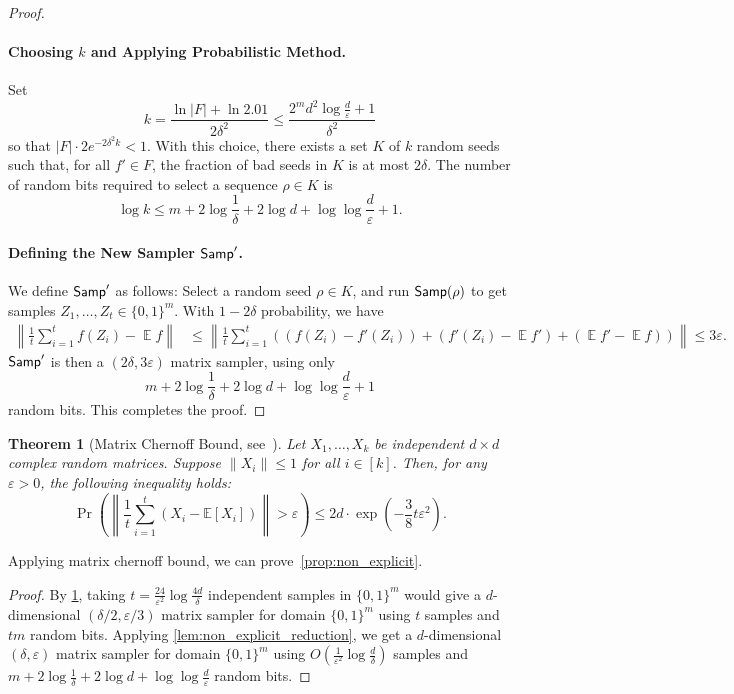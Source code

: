 \documentclass[11pt,letterpaper]{article}
\newtheorem{theorem}{Theorem}
\DeclareMathOperator*{\E}{\mathbb{E}}
\newcommand{\eps}{\varepsilon}
\newcommand{\1}{\mathbbm{1}}
\newcommand{\tuple}[1]{\left(#1\right)}
\newcommand{\zo}{\{0, 1\}}
\newcommand{\Smp}{\textup{\textsf{Samp}}}
\begin{document}
\begin{proof}
\paragraph{Choosing \( k \) and Applying Probabilistic Method.}
Set 
\[
k = \frac{\ln|F| + \ln 2.01}{2\delta^2} \le \frac{2^{m}d^2\log\frac{d}{\eps} + 1}{\delta^2}
\]
so that \( |F| \cdot 2 e^{-2\delta^2 k} < 1 \). With this choice, there exists a set \( K \) of \( k \) random seeds such that, for all \( f' \in F \), the fraction of bad seeds in \( K \) is at most \( 2\delta \). The number of random bits required to select a sequence \( \rho \in K \) is 
\[
\log k \le m + 2 \log \frac{1}{\delta} + 2 \log d + \log \log \frac{d}{\eps} + 1.
\]

\paragraph{Defining the New Sampler \( \Smp' \).}
We define \( \Smp' \) as follows: Select a random seed \( \rho \in K \), and run \( \Smp(\rho) \) to get samples $Z_1, \dots, Z_t \in \zo^m$. With $1 - 2\delta$ probability, we have 
\begin{align*}
\left\| \frac{1}{t} \sum_{i=1}^t f(Z_i) - \E f \right\| &\leq \left\| \frac{1}{t} \sum_{i=1}^t \left( (f(Z_i) -  f'(Z_i)) + (f'(Z_i)  - \E f') + (\E f' - \E f) \right) \right\| \le 3\eps.
\end{align*}
\( \Smp' \) is then a \( (2\delta, 3\eps) \) matrix sampler, using only 
\[
 m + 2 \log \frac{1}{\delta} + 2 \log d + \log \log \frac{d}{\eps} + 1
\]
random bits.
This completes the proof.
\end{proof}

\begin{theorem}[Matrix Chernoff Bound, see~\cite{Tro15}]
    \label{thm:matrix_chernoff_bound}
    Let $X_1, \dots, X_k$ be independent $d \times d$ complex random matrices. Suppose  $\|X_i\| \leq 1$ for all $i \in [k]$. Then, for any $\varepsilon > 0$, the following inequality holds:
    \[
    \Pr\left( \left\| \frac{1}{t} \sum_{i=1}^t \tuple{ X_i - \mathbb{E}[X_i]} \right\| > \varepsilon \right) \leq 2d \cdot \exp\left( - \frac{3 }{8}  t\eps^2 \right).
    \]
\end{theorem}

Applying matrix chernoff bound, we can prove~\cref{prop:non_explicit}.

\nonExplicit*
\begin{proof}
    By \cref{thm:matrix_chernoff_bound}, taking $t = \frac{24}{\eps^2}\log\frac{4d}{\delta}$ independent samples in $\zo^m$ would give a $d$-dimensional $(\delta / 2, \eps / 3)$ matrix sampler for domain $\zo^m$ using $t$ samples and $tm$ random bits. Applying \cref{lem:non_explicit_reduction}, we get a $d$-dimensional $(\delta, \eps)$ matrix sampler for domain $\zo^m$ using $O(\frac{1}{\eps^2}\log\frac{d}{\delta})$ samples and $m + 2\log\frac{1}{\delta} + 2 \log d + \log \log \frac{d}{\eps}$ random bits.
\end{proof}
\end{document}

